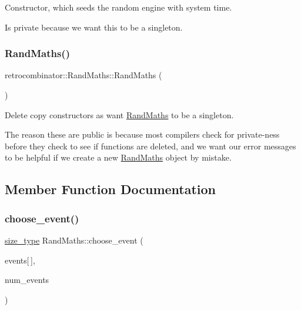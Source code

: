 Constructor, which seeds the random engine with system time. 

Is private because we want this to be a singleton. \mbox{\label{classretrocombinator_1_1RandMaths_aca899b8322519172fe008e0697c432db}} 
\subsubsection{\texorpdfstring{Rand\+Maths()}{RandMaths()}\hspace{0.1cm}{\footnotesize\ttfamily [2/2]}}
{\footnotesize\ttfamily retrocombinator\+::\+Rand\+Maths\+::\+Rand\+Maths (\begin{DoxyParamCaption}\item[{\hyperlink{classretrocombinator_1_1RandMaths}{Rand\+Maths} const \&}]{ }\end{DoxyParamCaption})\hspace{0.3cm}{\ttfamily [delete]}}



Delete copy constructors as want \hyperlink{classretrocombinator_1_1RandMaths}{Rand\+Maths} to be a singleton. 

The reason these are public is because most compilers check for private-\/ness before they check to see if functions are deleted, and we want our error messages to be helpful if we create a new \hyperlink{classretrocombinator_1_1RandMaths}{Rand\+Maths} object by mistake. 

\subsection{Member Function Documentation}
\mbox{\label{classretrocombinator_1_1RandMaths_a3834f9a074546f0d588247610f16fb0e}} 
\subsubsection{\texorpdfstring{choose\+\_\+event()}{choose\_event()}}
{\footnotesize\ttfamily \hyperlink{constants_8h_a8e1541b50cee66a791df4c437ccbb385}{size\+\_\+type} Rand\+Maths\+::choose\+\_\+event (\begin{DoxyParamCaption}\item[{const double}]{events\mbox{[}$\,$\mbox{]},  }\item[{\hyperlink{constants_8h_a8e1541b50cee66a791df4c437ccbb385}{size\+\_\+type}}]{num\+\_\+events }\end{DoxyParamCaption})}



